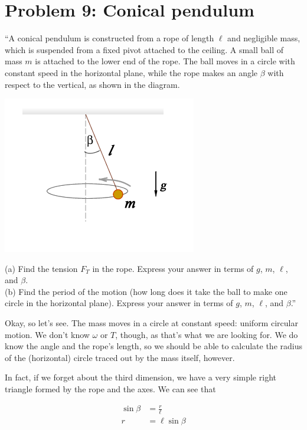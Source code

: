 \documentclass[8.01x]{subfiles}
\begin{document}
\section{Problem 9: Conical pendulum}

``A conical pendulum is constructed from a rope of length $\ell$ and negligible mass, which is suspended from a fixed pivot attached to the ceiling. A small ball of mass $m$ is attached to the lower end of the rope. The ball moves in a circle with constant speed in the horizontal plane, while the rope makes an angle $\beta$ with respect to the vertical, as shown in the diagram.

\begin{center}
\includegraphics[scale=1.0]{Graphics/h3p9}
\end{center}

(a) Find the tension $F_T$ in the rope. Express your answer in terms of $g$, $m$, $\ell$, and $\beta$.\\
(b) Find the period of the motion (how long does it take the ball to make one circle in the horizontal plane). Express your answer in terms of $g$, $m$, $\ell$, and $\beta$.''

Okay, so let's see. The mass moves in a circle at constant speed: uniform circular motion. We don't know $\omega$ or $T$, though, as that's what we are looking for. We do know the angle and the rope's length, so we should be able to calculate the radius of the (horizontal) circle traced out by the mass itself, however.

In fact, if we forget about the third dimension, we have a very simple right triangle formed by the rope and the axes. We can see that

\begin{align}
\sin \beta &= \frac{r}{\ell}\\
r &= \ell \sin \beta
\end{align}
\end{document}
